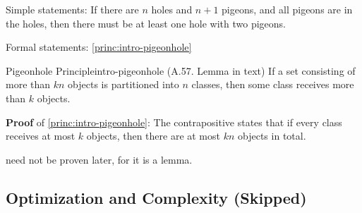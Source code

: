 \documentclass[../src/handouts/main.tex]{subfiles}
\begin{document}
Simple statements: If there are $n$ holes and $n + 1$ pigeons, and all pigeons are in the holes, then there must be at least one hole with two pigeons.

Formal statements: \cref{princ:intro-pigeonhole}

\begin{principle}{Pigeonhole Principle}{intro-pigeonhole}
  (A.57. Lemma in text)
  If a set consisting of more than $kn$ objects is partitioned into $n$ classes, then some class receives more than $k$ objects.
\end{principle}

\textbf{Proof} of \cref{princ:intro-pigeonhole}: The contrapositive states that if every class receives at most $k$ objects, then there are at most $kn$ objects in total.

 need not be proven later, for it is a lemma.

\subsection{Optimization and Complexity (Skipped)}
\end{document}
